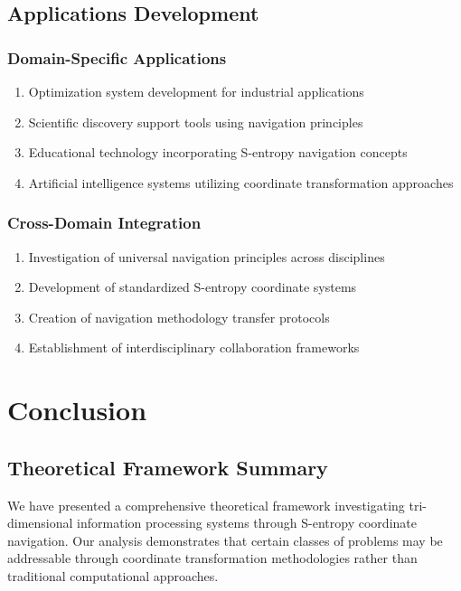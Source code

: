\documentclass[11pt]{article}
\begin{document}
\subsection{Applications Development}

\subsubsection{Domain-Specific Applications}

\begin{enumerate}
\item Optimization system development for industrial applications
\item Scientific discovery support tools using navigation principles
\item Educational technology incorporating S-entropy navigation concepts
\item Artificial intelligence systems utilizing coordinate transformation approaches
\end{enumerate}

\subsubsection{Cross-Domain Integration}

\begin{enumerate}
\item Investigation of universal navigation principles across disciplines
\item Development of standardized S-entropy coordinate systems
\item Creation of navigation methodology transfer protocols
\item Establishment of interdisciplinary collaboration frameworks
\end{enumerate}

\section{Conclusion}

\subsection{Theoretical Framework Summary}

We have presented a comprehensive theoretical framework investigating tri-dimensional information processing systems through S-entropy coordinate navigation. Our analysis demonstrates that certain classes of problems may be addressable through coordinate transformation methodologies rather than traditional computational approaches.
\end{document}
